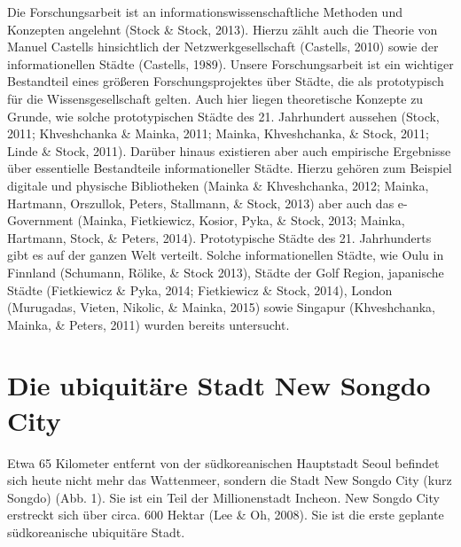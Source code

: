 \documentclass[a4paper,
fontsize=11pt,
oneside,
numbers=noperiodatend,
parskip=half-,
bibliography=totoc,
final
]{scrartcl}
\begin{document}
Die Forschungsarbeit ist an informationswissenschaftliche Methoden und
Konzepten angelehnt (Stock \& Stock, 2013). Hierzu zählt auch die
Theorie von Manuel Castells hinsichtlich der Netzwerkgesellschaft
(Castells, 2010) sowie der informationellen Städte (Castells, 1989).
Unsere Forschungsarbeit ist ein wichtiger Bestandteil eines größeren
Forschungsprojektes über Städte, die als prototypisch für die
Wissensgesellschaft gelten. Auch hier liegen theoretische Konzepte zu
Grunde, wie solche prototypischen Städte des 21. Jahrhundert aussehen
(Stock, 2011; Khveshchanka \& Mainka, 2011; Mainka, Khveshchanka, \&
Stock, 2011; Linde \& Stock, 2011). Darüber hinaus existieren aber auch
empirische Ergebnisse über essentielle Bestandteile informationeller
Städte. Hierzu gehören zum Beispiel digitale und physische Bibliotheken
(Mainka \& Khveshchanka, 2012; Mainka, Hartmann, Orszullok, Peters,
Stallmann, \& Stock, 2013) aber auch das e-Government (Mainka,
Fietkiewicz, Kosior, Pyka, \& Stock, 2013; Mainka, Hartmann, Stock, \&
Peters, 2014). Prototypische Städte des 21. Jahrhunderts gibt es auf der
ganzen Welt verteilt. Solche informationellen Städte, wie Oulu in
Finnland (Schumann, Rölike, \& Stock 2013), Städte der Golf Region,
japanische Städte (Fietkiewicz \& Pyka, 2014; Fietkiewicz \& Stock,
2014), London (Murugadas, Vieten, Nikolic, \& Mainka, 2015) sowie
Singapur (Khveshchanka, Mainka, \& Peters, 2011) wurden bereits
untersucht.

\section*{Die ubiquitäre Stadt New Songdo
City}\label{die-ubiquituxe4re-stadt-new-songdo-city}

Etwa 65 Kilometer entfernt von der südkoreanischen Hauptstadt Seoul
befindet sich heute nicht mehr das Wattenmeer, sondern die Stadt New
Songdo City (kurz Songdo) (Abb. 1). Sie ist ein Teil der Millionenstadt
Incheon. New Songdo City erstreckt sich über circa. 600 Hektar (Lee \&
Oh, 2008). Sie ist die erste geplante südkoreanische ubiquitäre Stadt.
\end{document}
